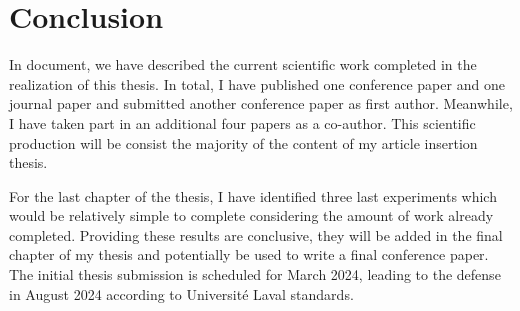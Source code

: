 \section{Conclusion}
\label{sec:conclusion}

In document, we have described the current scientific work completed in the realization of this thesis.
In total, I have published one conference paper and one journal paper and submitted another conference paper as first author.
Meanwhile, I have taken part in an additional four papers as a co-author.
This scientific production will be consist the majority of the content of my article insertion thesis.

For the last chapter of the thesis, I have identified three last experiments which would be relatively simple to complete considering the amount of work already completed.
Providing these results are conclusive, they will be added in the final chapter of my thesis and potentially be used to write a final conference paper.
The initial thesis submission is scheduled for March 2024, leading to the defense in August 2024 according to Université Laval standards.

